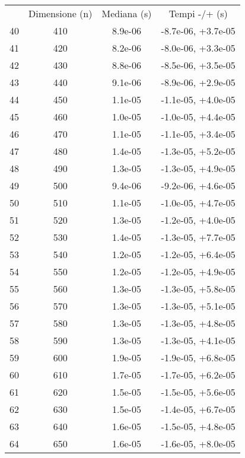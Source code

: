 \begin{table}
\centering
\begin{adjustbox}{width=1\textwidth/2}
\begin{tabular}{|c|c|c|c|}
\hline
 & Dimensione (n) & Mediana (s) & Tempi -/+ (s) \\
40 & 410 & 8.9e-06 & -8.7e-06, +3.7e-05 \\
\cline{1-4}
41 & 420 & 8.2e-06 & -8.0e-06, +3.3e-05 \\
\cline{1-4}
42 & 430 & 8.8e-06 & -8.5e-06, +3.5e-05 \\
\cline{1-4}
43 & 440 & 9.1e-06 & -8.9e-06, +2.9e-05 \\
\cline{1-4}
44 & 450 & 1.1e-05 & -1.1e-05, +4.0e-05 \\
\cline{1-4}
45 & 460 & 1.0e-05 & -1.0e-05, +4.4e-05 \\
\cline{1-4}
46 & 470 & 1.1e-05 & -1.1e-05, +3.4e-05 \\
\cline{1-4}
47 & 480 & 1.4e-05 & -1.3e-05, +5.2e-05 \\
\cline{1-4}
48 & 490 & 1.3e-05 & -1.3e-05, +4.9e-05 \\
\cline{1-4}
49 & 500 & 9.4e-06 & -9.2e-06, +4.6e-05 \\
\cline{1-4}
50 & 510 & 1.1e-05 & -1.0e-05, +4.7e-05 \\
\cline{1-4}
51 & 520 & 1.3e-05 & -1.2e-05, +4.0e-05 \\
\cline{1-4}
52 & 530 & 1.4e-05 & -1.3e-05, +7.7e-05 \\
\cline{1-4}
53 & 540 & 1.2e-05 & -1.2e-05, +6.4e-05 \\
\cline{1-4}
54 & 550 & 1.2e-05 & -1.2e-05, +4.9e-05 \\
\cline{1-4}
55 & 560 & 1.3e-05 & -1.3e-05, +5.8e-05 \\
\cline{1-4}
56 & 570 & 1.3e-05 & -1.3e-05, +5.1e-05 \\
\cline{1-4}
57 & 580 & 1.3e-05 & -1.3e-05, +4.8e-05 \\
\cline{1-4}
58 & 590 & 1.3e-05 & -1.3e-05, +4.1e-05 \\
\cline{1-4}
59 & 600 & 1.9e-05 & -1.9e-05, +6.8e-05 \\
\cline{1-4}
60 & 610 & 1.7e-05 & -1.7e-05, +6.2e-05 \\
\cline{1-4}
61 & 620 & 1.5e-05 & -1.5e-05, +5.6e-05 \\
\cline{1-4}
62 & 630 & 1.5e-05 & -1.4e-05, +6.7e-05 \\
\cline{1-4}
63 & 640 & 1.6e-05 & -1.5e-05, +4.8e-05 \\
\cline{1-4}
64 & 650 & 1.6e-05 & -1.6e-05, +8.0e-05 \\

\end{tabular}
\end{adjustbox}
\end{table}
